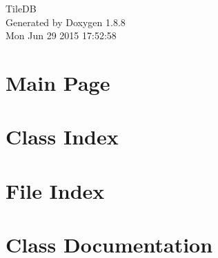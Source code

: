 \documentclass[twoside]{book}
\newcommand{\+}{\discretionary{\mbox{\scriptsize$\hookleftarrow$}}{}{}}
\newcommand{\clearemptydoublepage}{%
  \newpage{\pagestyle{empty}\cleardoublepage}%
}
\begin{document}
\hypersetup{pageanchor=false,
             bookmarks=true,
             bookmarksnumbered=true,
             pdfencoding=unicode
            }
\begin{titlepage}
\vspace*{7cm}
\begin{center}%
{\Large Tile\+D\+B }\\
\vspace*{1cm}
{\large Generated by Doxygen 1.8.8}\\
\vspace*{0.5cm}
{\small Mon Jun 29 2015 17:52:58}\\
\end{center}
\end{titlepage}
\clearemptydoublepage
\tableofcontents
\clearemptydoublepage
{}
\hypersetup{pageanchor=true}

\chapter{Main Page}
\label{index}\hypertarget{index}{}
\chapter{Class Index}

\chapter{File Index}

\chapter{Class Documentation}










































\end{document}

